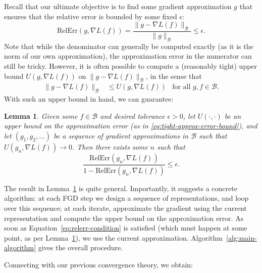 \documentclass{article}
\newtheorem{lemma}[theorem]{Lemma}
\newcommand{\B}{\mathcal{B}}
\newcommand{\RelErr}{\mathrm{RelErr}}
\begin{document}
Recall that our ultimate objective is to find some gradient approximation $g$ that ensures that the relative error is bounded by some fixed $\epsilon$:
\[ \RelErr(g, \nabla L(f)) = \frac{\lVert g - \nabla L(f) \rVert_\B}{\lVert g \rVert_\B} \leq \epsilon. \]
Note that while the denominator can generally be computed exactly (as it is the norm of our own approximation), the approximation error in the numerator can still be tricky. However, it is often possible to compute a (reasonably tight) upper bound $U(g, \nabla L(f))$ on $\lVert g - \nabla L(f) \rVert_\B$, in the sense that
\begin{equation}\label{eq:tight-approx-error-bound}
    \begin{aligned}
        \lVert g - \nabla L(f) \rVert_\B &\leq U(g, \nabla L(f)) &\text{for all $g, f \in \B$}.
    \end{aligned}
\end{equation}
With such an upper bound in hand, we can guarantee:
\begin{lemma}\label{lemma:approx-error-limit}
    Given some $f \in \B$ and desired tolerance $\epsilon>0$,
    let $U(\cdot, \cdot)$ be an upper bound on the approximation error (as in \eqref{eq:tight-approx-error-bound}), and
    let $(g_1, g_2, \ldots)$ be a sequence of gradient approximations in $\B$ such that $U(g_n, \nabla L(f)) \to 0$.
    Then there exists some $n$ such that
    \begin{equation}\label{eq:relerr-condition}
        \frac{\RelErr(g_n, \nabla L(f))}{1 - \RelErr(g_n, \nabla L(f))} \leq \epsilon.
    \end{equation}
\end{lemma}

The result in Lemma~\ref{lemma:approx-error-limit} is quite general.
Importantly, it suggests a concrete algorithm: at each FGD step we design a sequence of representations, and loop over this sequence; at each iterate, approximate the gradient using the current representation and compute the upper bound on the approximation error. As soon as Equation~\ref{eq:relerr-condition} is satisfied (which must happen at some point, as per Lemma~\ref{lemma:approx-error-limit}), we use the current approximation.
Algorithm~\ref{alg:main-algorithm} gives the overall procedure.



Connecting with our previous convergence theory, we obtain:
\end{document}
